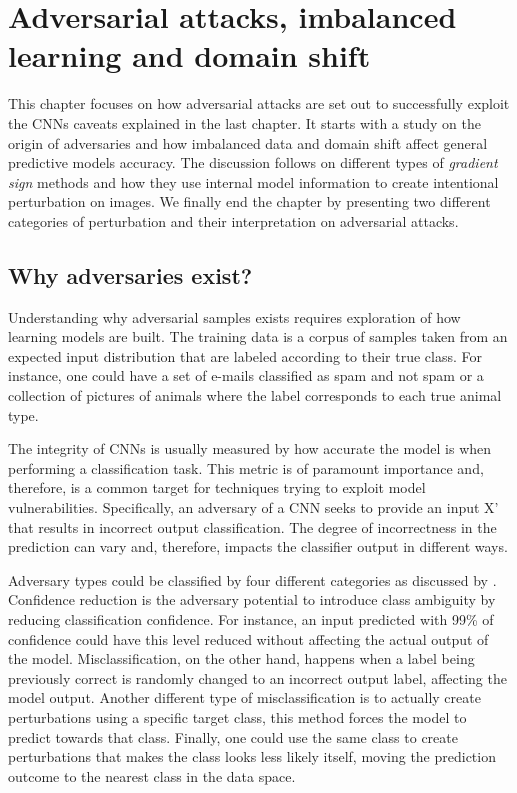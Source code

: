 \chapter{Adversarial attacks, imbalanced learning and domain shift}

This chapter focuses on how adversarial attacks are set out to successfully exploit the CNNs caveats explained in the last chapter. It starts with a study on the origin of adversaries and how imbalanced data and domain shift affect general predictive models accuracy. The discussion follows on different types of \textit{gradient sign} methods and how they use internal model information to create intentional perturbation on images. We finally end the chapter by presenting two different categories of perturbation and their interpretation on adversarial attacks.
\section{Why adversaries exist?}

Understanding why adversarial samples exists requires exploration of how learning models are built. The training data is a corpus of samples taken from an expected input distribution that are labeled according to their true class. For instance, one could have a set of e-mails classified as spam and not spam or a collection of pictures of animals where the label corresponds to each true animal type.

The integrity of CNNs is usually measured by how accurate the model is when performing a classification task. This metric is of paramount importance and, therefore, is a common target for techniques trying to exploit model vulnerabilities. Specifically, an adversary of a CNN seeks to provide an input X' that results in incorrect output classification. The degree of incorrectness in the prediction can vary and, therefore, impacts the classifier output in different ways.

Adversary types could be classified by four different categories as discussed by \cite{papernot_thesis_2016}. Confidence reduction is the adversary potential to introduce class ambiguity by reducing classification confidence. For instance, an input predicted with 99\% of confidence could have this level reduced without affecting the actual output of the model. Misclassification, on the other hand, happens when a label being previously correct is randomly changed to an incorrect output label, affecting the model output. Another different type of misclassification is to actually create perturbations using a specific target class, this method forces the model to predict towards that class. Finally, one could use the same class to create perturbations that makes the class looks less likely itself, moving the prediction outcome to the nearest class in the data space.

